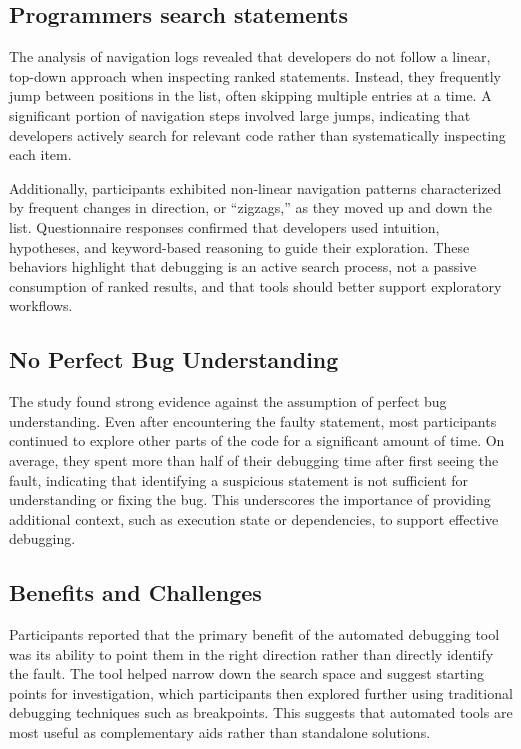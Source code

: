 \subsection{Programmers search statements}

The analysis of navigation logs revealed that developers do not follow a linear, top-down approach when inspecting ranked statements. Instead, they frequently jump between positions in the list, often skipping multiple entries at a time. A significant portion of navigation steps involved large jumps, indicating that developers actively search for relevant code rather than systematically inspecting each item.

Additionally, participants exhibited non-linear navigation patterns characterized by frequent changes in direction, or “zigzags,” as they moved up and down the list. Questionnaire responses confirmed that developers used intuition, hypotheses, and keyword-based reasoning to guide their exploration. These behaviors highlight that debugging is an active search process, not a passive consumption of ranked results, and that tools should better support exploratory workflows.

\subsection{No Perfect Bug Understanding}

The study found strong evidence against the assumption of perfect bug understanding. Even after encountering the faulty statement, most participants continued to explore other parts of the code for a significant amount of time. On average, they spent more than half of their debugging time after first seeing the fault, indicating that identifying a suspicious statement is not sufficient for understanding or fixing the bug. This underscores the importance of providing additional context, such as execution state or dependencies, to support effective debugging.

\subsection{Benefits and Challenges}

Participants reported that the primary benefit of the automated debugging tool was its ability to point them in the right direction rather than directly identify the fault. The tool helped narrow down the search space and suggest starting points for investigation, which participants then explored further using traditional debugging techniques such as breakpoints. This suggests that automated tools are most useful as complementary aids rather than standalone solutions.

